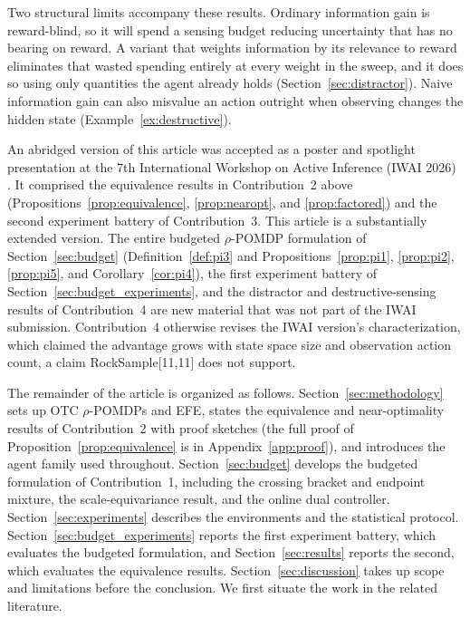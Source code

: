 \begin{enumerate}
    Two structural limits accompany these results. Ordinary information gain is reward-blind, so it will spend a sensing budget reducing uncertainty that has no bearing on reward. A variant that weights information by its relevance to reward eliminates that wasted spending entirely at every weight in the sweep, and it does so using only quantities the agent already holds (Section~\ref{sec:distractor}). Naive information gain can also misvalue an action outright when observing changes the hidden state (Example~\ref{ex:destructive}).
\end{enumerate}

An abridged version of this article was accepted as a poster and spotlight presentation at the 7th International Workshop on Active Inference (IWAI 2026) \citep{cooper2026iwai}. It comprised the equivalence results in Contribution~2 above (Propositions~\ref{prop:equivalence}, \ref{prop:nearopt}, and \ref{prop:factored}) and the second experiment battery of Contribution~3. This article is a substantially extended version. The entire budgeted $\rho$-POMDP formulation of Section~\ref{sec:budget} (Definition~\ref{def:pi3} and Propositions~\ref{prop:pi1}, \ref{prop:pi2}, \ref{prop:pi5}, and Corollary~\ref{cor:pi4}), the first experiment battery of Section~\ref{sec:budget_experiments}, and the distractor and destructive-sensing results of Contribution~4 are new material that was not part of the IWAI submission. Contribution~4 otherwise revises the IWAI version's characterization, which claimed the advantage grows with state space size and observation action count, a claim RockSample[11,11] does not support.

The remainder of the article is organized as follows. Section~\ref{sec:methodology} sets up OTC $\rho$-POMDPs and EFE, states the equivalence and near-optimality results of Contribution~2 with proof sketches (the full proof of Proposition~\ref{prop:equivalence} is in Appendix~\ref{app:proof}), and introduces the agent family used throughout. Section~\ref{sec:budget} develops the budgeted formulation of Contribution~1, including the crossing bracket and endpoint mixture, the scale-equivariance result, and the online dual controller. Section~\ref{sec:experiments} describes the environments and the statistical protocol. Section~\ref{sec:budget_experiments} reports the first experiment battery, which evaluates the budgeted formulation, and Section~\ref{sec:results} reports the second, which evaluates the equivalence results. Section~\ref{sec:discussion} takes up scope and limitations before the conclusion. We first situate the work in the related literature.
